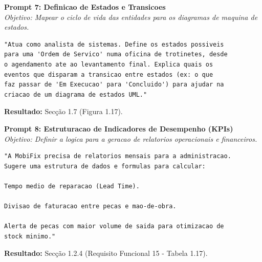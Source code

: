 \documentclass[a4paper,12pt]{scrreprt}
\begin{document}
\vspace{1em}
\noindent\textbf{Prompt 7: Definicao de Estados e Transicoes} \\
\textit{Objetivo: Mapear o ciclo de vida das entidades para os diagramas de maquina de estados.}
\begin{lstlisting}
"Atua como analista de sistemas. Define os estados possiveis
para uma 'Ordem de Servico' numa oficina de trotinetes, desde
o agendamento ate ao levantamento final. Explica quais os 
eventos que disparam a transicao entre estados (ex: o que 
faz passar de 'Em Execucao' para 'Concluido') para ajudar na 
criacao de um diagrama de estados UML."
\end{lstlisting}
\textbf{Resultado:} Secção 1.7 (Figura 1.17).

\newpage
\vspace{1em}
\noindent\textbf{Prompt 8: Estruturacao de Indicadores de Desempenho (KPIs)} \\
\textit{Objetivo: Definir a logica para a geracao de relatorios operacionais e financeiros.}
\begin{lstlisting}
"A MobiFix precisa de relatorios mensais para a administracao.
Sugere uma estrutura de dados e formulas para calcular:

Tempo medio de reparacao (Lead Time).

Divisao de faturacao entre pecas e mao-de-obra.

Alerta de pecas com maior volume de saida para otimizacao de 
stock minimo."
\end{lstlisting}
\textbf{Resultado:} Secção 1.2.4 (Requisito Funcional 15 - Tabela 1.17).

\vspace{1em}


\vspace{1.5em}
\end{document}
